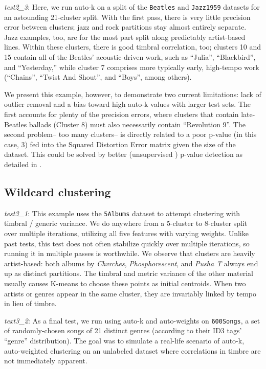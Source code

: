 \documentclass[12pt,twocolumn,titlepage]{article}
\begin{document}
\emph{test2\_3}: Here, we run auto-k on a split of the \texttt{Beatles} and \texttt{Jazz1959} datasets for an astounding 21-cluster split. With the first pass, there is very little precision error between clusters; jazz and rock partitions stay almost entirely separate. Jazz examples, too, are for the most part split along predictably artist-based lines. Within these clusters, there is good timbral correlation, too; clusters 10 and 15 contain all of the Beatles' acoustic-driven work, such as ``Julia'', ``Blackbird'', and ``Yesterday,'' while cluster 7 comprises more typically early, high-tempo work (``Chains'', ``Twist And Shout'', and ``Boys'', among others). 

We present this example, however, to demonstrate two current limitations: lack of outlier removal and a bias toward high auto-k values with larger test sets. The first accounts for plenty of the precision errors, where clusters that contain late-Beatles ballads (Cluster 8) must also necessarily contain ``Revolution 9''. The second problem-- too many clusters-- is directly related to a poor p-value (in this case, 3) fed into the Squared Distortion Error matrix given the size of the dataset. This could be solved by better (unsupervised ) p-value detection as detailed in \cite{SemiSupPNorm}.

\subsection{Wildcard clustering}

\emph{test3\_1}: This example uses the \texttt{5Albums} dataset to attempt clustering with timbral / generic variance. We do anywhere from a 5-cluster to 8-cluster split over multiple iterations, utilizing all five features with varying weights. Unlike past tests, this test does not often stabilize quickly over multiple iterations, so running it in multiple passes is worthwhile. We observe that clusters are heavily artist-based: both albums by \emph{Chvrches}, \emph{Phosphorescent}, and \emph{Pusha T} always end up as distinct partitions. The timbral and metric variance of the other material usually causes K-means to choose these points as initial centroids. When two artists or genres appear in the same cluster, they are invariably linked by tempo in lieu of timbre. 

\emph{text3\_2}: As a final test, we run using auto-k and auto-weights on \texttt{600Songs}, a set of randomly-chosen songs of 21 distinct genres (according to their ID3 tags' ``genre'' distribution). The goal was to simulate a real-life scenario of auto-k, auto-weighted clustering on an unlabeled dataset where correlations in timbre are not immediately apparent.
\end{document}
